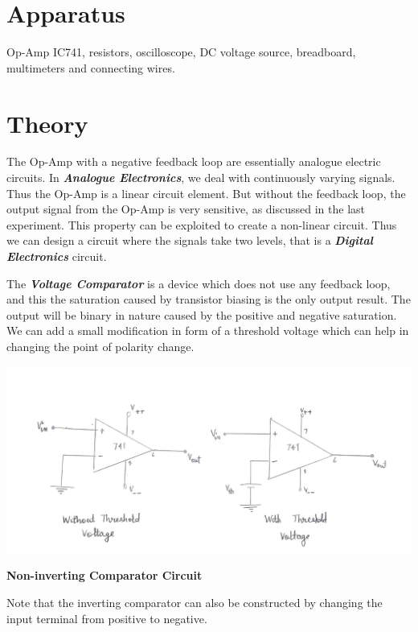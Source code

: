 \section{Apparatus}
\noindent Op-Amp IC741, resistors, oscilloscope, DC voltage source, breadboard, multimeters and connecting wires.
\section{Theory}
\noindent The Op-Amp with a negative feedback loop are essentially analogue electric circuits. In \textbf{\emph{Analogue Electronics}}, we  deal with continuously varying signals. Thus the Op-Amp is a linear circuit element. But without the feedback loop, the output signal from the Op-Amp is very sensitive, as discussed in the last experiment. This property can be exploited to create a non-linear circuit. Thus we can design a circuit where the signals take two levels, that is a \textbf{\emph{Digital Electronics}} circuit. 
\par
\noindent The \textbf{\emph{Voltage Comparator}} is a device which does not use any feedback loop, and this the saturation caused by transistor biasing is the only output result. The output will be binary in nature caused by the positive and negative saturation. We can add a small modification in form of a threshold voltage which can help in changing the point of polarity change.
\begin{center}
    \includegraphics[scale = 0.21]{OPAMP Apps/1614500891771.jpg}
\end{center}
\begin{center}
    \textbf{Non-inverting Comparator Circuit}
\end{center}
\noindent Note that the inverting comparator can also be constructed by changing the input terminal from positive to negative. 

